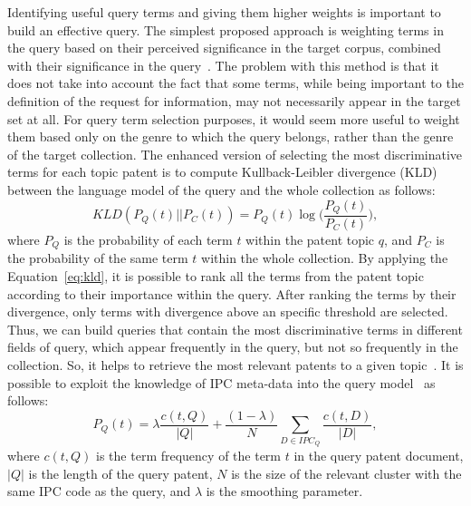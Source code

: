 Identifying useful query terms and giving them higher weights is important to build an effective query. The simplest proposed approach is weighting terms in the query based on their perceived significance in the target corpus, combined with their significance in the query~\citep{itoh2003term}. The problem with this method is that it does not take into account the fact that some terms, while being important to the definition of the request for information, may not necessarily appear in the target set at all. For query term selection purposes, it would seem more useful to weight them based only on the genre to which the query belongs, rather than the genre of the target collection. The enhanced version of selecting the most discriminative terms for each topic patent is to compute Kullback-Leibler divergence (KLD)~\citep{kullback1951information} between the language model of the query and the whole collection as follows:
\begin{equation}
\label{eq:kld}
 KLD(P_{Q}(t)||P_{C}(t)) = P_{Q}(t)\log\Big(\frac{P_{Q}(t)}{P_{C}(t)}\Big),  
\end{equation}
where $ P_{Q} $ is the probability of each term $ t $ within the patent topic $ q $, and $ P_{C} $ is the probability of the same term $ t $ within the whole collection. 
By applying the Equation~\ref{eq:kld}, it is possible to rank all the terms from the patent topic according to their importance within the query. After ranking the terms by their divergence, only terms with divergence above an specific threshold are selected. Thus, we can build queries that contain the most discriminative terms in different fields of query, which appear frequently in the query, but not so frequently in the collection. So, it helps to retrieve the most relevant patents to a given topic~\citep{perez2010using}. It is possible to exploit the knowledge of IPC meta-data into the query model~\citep{mahdabi2011building} as follows:
\begin{equation}
\label{eq:IPCmodel}
 P_{Q}(t) = \lambda\frac{c(t,Q)}{|Q|}+\frac{(1-\lambda)}{N}\sum_{D\in IPC_{Q}}\frac{c(t,D)}{|D|} , 
\end{equation}
where $ c(t,Q) $ is the term frequency of the term $ t $ in the query patent document, $ |Q| $ is the length of the query patent, $ N $ is the size of the relevant cluster with the same IPC code as the query, and $ \lambda $ is the smoothing parameter.

